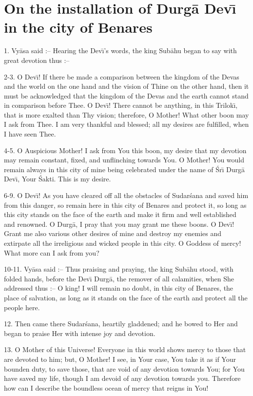 \chapter{On the installation of Durg\=a Dev\={\i} in the city of Benares}

1. Vy\=asa said :-- Hearing the Dev\={\i}'s words, the king Sub\=ahu began to say with great devotion thus :--

2-3. O Dev\={\i}! If there be made a comparison between the kingdom of the Devas and the world on the one hand and the vision of Thine on the other hand, then it must be acknowledged that the kingdom of the Devas and the earth cannot stand in comparison before Thee. O Dev\={\i}! There cannot be anything, in this Trilok\={\i}, that is more exalted than Thy vision; therefore, O Mother! What other boon may I ask from Thee. I am very thankful and blessed; all my desires are fulfilled, when I have seen Thee.

4-5. O Auspicious Mother! I ask from You this boon, my desire that my devotion may remain constant, fixed, and unflinching towards You. O Mother! You would remain always in this city of mine being celebrated under the name of \'Sr\={\i} Durg\=a Dev\={\i}, Your \'Sakti. This is my desire.

6-9. O Dev\={\i}! As you have cleared off all the obstacles of Sudar\'sana and saved him from this danger, so remain here in this city of Benares and protect it, so long as this city stands on the face of the earth and make it firm and well established and renowned. O Durg\=a, I pray that you may grant me these boons. O Dev\={\i}! Grant me also various other desires of mine and destroy my enemies and extirpate all the irreligious and wicked people in this city. O Goddess of mercy! What more can I ask from you?

10-11. Vy\=asa said :-- Thus praising and praying, the king Sub\=ahu stood, with folded hands, before the Dev\={\i} Durg\=a, the remover of all calamities, when She addressed thus :-- O king! I will remain no doubt, in this city of Benares, the place of salvation, as long as it stands on the face of the earth and protect all the people here.

12. Then came there Sudar\'sana, heartily gladdened; and he bowed to Her and began to praise Her with intense joy and devotion.

13. O Mother of this Universe! Everyone in this world shows mercy to those that are devoted to him; but, O Mother! I see, in Your case, You take it as if Your bounden duty, to save those, that are void of any devotion towards You; for You have saved my life, though I am devoid of any devotion towards you. Therefore how can I describe the boundless ocean of mercy that reigns in You!

